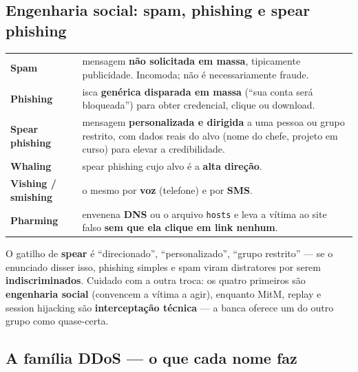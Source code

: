 \subsection{Engenharia social: spam, phishing e spear phishing}

\begin{center}
\begin{tabular}{@{}p{2.9cm}p{9.1cm}@{}}
\toprule
\textbf{Spam} & mensagem \textbf{não solicitada em massa}, tipicamente
publicidade. Incomoda; não é necessariamente fraude. \\
\textbf{Phishing} & isca \textbf{genérica disparada em massa} (``sua conta
será bloqueada'') para obter credencial, clique ou download. \\
\textbf{Spear phishing} & mensagem \textbf{personalizada e dirigida} a uma
pessoa ou grupo restrito, com dados reais do alvo (nome do chefe, projeto em
curso) para elevar a credibilidade. \\
\textbf{Whaling} & spear phishing cujo alvo é a \textbf{alta direção}. \\
\textbf{Vishing / smishing} & o mesmo por \textbf{voz} (telefone) e por
\textbf{SMS}. \\
\textbf{Pharming} & envenena \textbf{DNS} ou o arquivo \texttt{hosts} e leva
a vítima ao site falso \textbf{sem que ela clique em link nenhum}. \\
\bottomrule
\end{tabular}
\end{center}

\begin{pegadinha}
O gatilho de \textbf{spear} é ``direcionado'', ``personalizado'', ``grupo
restrito'' --- se o enunciado disser isso, phishing simples e spam viram
distratores por serem \textbf{indiscriminados}. Cuidado com a outra troca: os
quatro primeiros são \textbf{engenharia social} (convencem a vítima a agir),
enquanto MitM, replay e session hijacking são \textbf{interceptação técnica}
--- a banca oferece um do outro grupo como quase-certa.
\end{pegadinha}

\subsection{A família DDoS --- o que cada nome faz}

